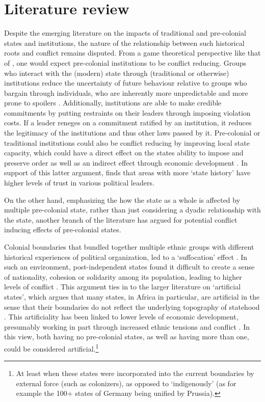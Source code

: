\documentclass[12pt]{article}
\begin{document}
\section{Literature review} \label{Literature review} 

Despite the emerging literature on the impacts of traditional and pre-colonial
states and institutions, the nature of the relationship between such historical
roots and conflict remains disputed. From a game theoretical perspective like
that of \citet{Fearon1995}, one would expect pre-colonial institutions to be
conflict reducing. Groups who interact with the (modern) state through
(traditional or otherwise) institutions reduce the uncertainty of future
behaviour relative to groups who bargain through individuals, who are inherently
more unpredictable and more prone to spoilers \citep{Wig2016}. Additionally,
institutions are able to make credible commitments by putting restraints on
their leaders through imposing violation costs. If a leader reneges on a
commitment ratified by an institution, it reduces the legitimacy of the
institutions and thus other laws passed by it. Pre-colonial or traditional
institutions could also be conflict reducing by improving local state capacity,
which could have a direct effect on the states ability to impose and preserve
order as well as an indirect effect through economic development
\citep{Depetris-Chauvin2016}. In support of this latter argument,
\citet{Depetris-Chauvin2016} finds that areas with more `state history' have
higher levels of trust in various political leaders.

On the other hand, emphasizing the how the state as a whole is affected by
multiple pre-colonial state, rather than just considering a dyadic relationship
with the state, another branch of the literature has argued for potential
conflict inducing effects of pre-colonial states.

Colonial boundaries that bundled together multiple ethnic groups with different
historical experiences of political organization, led to a `suffocation' effect
\citep{Englebert2002}. In such an environment, post-independent states found it
difficult to create a sense of nationality, cohesion or solidarity among its
population, leading to higher levels of conflict \citep{Englebert2002}. This
argument ties in to the larger literature on `artificial states', which argues
that many states, in Africa in particular, are artificial in the sense that
their boundaries do not reflect the underlying topography of statehood
\citep{Alesina2011}. This artificiality has been linked to lower levels of
economic development, presumably working in part through increased ethnic
tensions and conflict \citep{Alesina2011}. In this view, both having no
pre-colonial states, as well as having more than one, could be considered
artificial.\footnote{At least when these states were incorporated into the
current boundaries by external force (such as colonizers), as opposed to
`indigenously' (as for example the 100+ states of Germany being unified by
Prussia).} 
\end{document}
